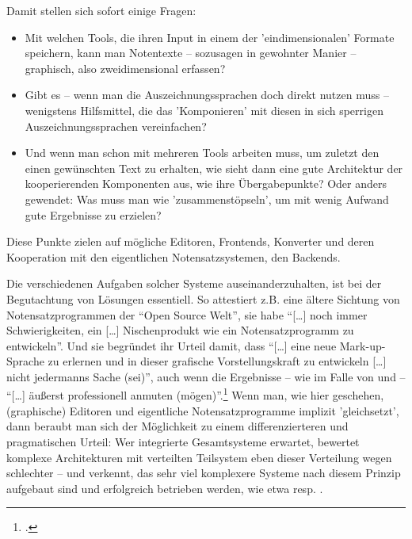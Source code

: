 Damit stellen sich sofort einige Fragen:

\begin{itemize}
  \item Mit welchen Tools, die ihren Input in einem der 'eindimensionalen'
  Formate speichern, kann man Notentexte -- sozusagen in gewohnter Manier
  -- graphisch, also zweidimensional erfassen?
  \item Gibt es -- wenn man die Auszeichnungssprachen doch direkt nutzen muss --
  wenigstens Hilfsmittel, die das 'Komponieren' mit diesen in sich sperrigen
  Auszeichnungssprachen vereinfachen?
  \item Und wenn man schon mit mehreren Tools arbeiten muss, um zuletzt den
  einen gewünschten Text zu erhalten, wie sieht dann eine gute Architektur der
  kooperierenden Komponenten aus, wie ihre Übergabepunkte? Oder anders gewendet:
  Was muss man wie 'zusammenstöpseln', um mit wenig Aufwand gute Ergebnisse zu
  erzielen?
\end{itemize}

Diese Punkte zielen auf mögliche Editoren, Frontends, Konverter und deren
Kooperation mit den eigentlichen Notensatzsystemen, den Backends. 


Die verschiedenen Aufgaben solcher Systeme auseinanderzuhalten, ist bei der
Begutachtung von Lösungen essentiell. So attestiert z.B. eine ältere Sichtung
von Notensatzprogrammen der \enquote{Open Source Welt}, sie habe
\enquote{[\ldots] noch immer Schwierigkeiten, ein [\ldots] Nischenprodukt wie
ein Notensatzprogramm zu entwickeln}. Und sie begründet ihr Urteil damit, dass
\enquote{[\ldots] eine neue Mark-up-Sprache zu erlernen und in dieser grafische
Vorstellungskraft zu entwickeln [\ldots] nicht jedermanns Sache (sei)}, auch
wenn die Ergebnisse -- wie im Falle von  und  --
\enquote{[\ldots] äußerst professionell anmuten
(mögen)}.\footcite[vgl.][51]{Albrecht2009a} Wenn man, wie hier geschehen,
(graphische) Editoren und eigentliche Notensatzprogramme implizit 'gleichsetzt',
dann beraubt man sich der Möglichkeit zu einem differenzierteren und
pragmatischen Urteil: Wer integrierte Gesamtsysteme erwartet, bewertet komplexe
Architekturen mit verteilten Teilsystem eben dieser Verteilung wegen schlechter
-- und verkennt, das sehr viel komplexere Systeme nach diesem Prinzip aufgebaut
sind und erfolgreich betrieben werden, wie etwa  resp.
.


